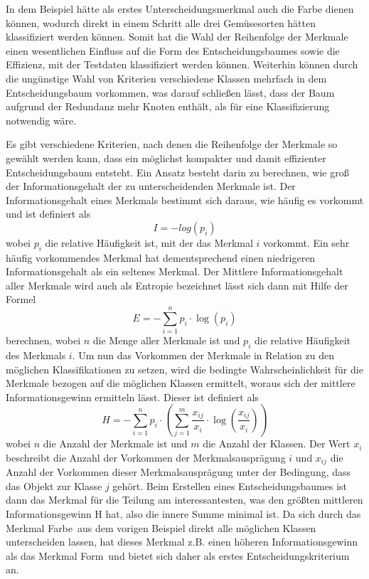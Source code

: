In dem Beispiel hätte als erstes Unterscheidungsmerkmal auch die Farbe dienen können, wodurch direkt in einem Schritt alle drei Gemüsesorten hätten klassifiziert werden können. Somit hat die Wahl der Reihenfolge der Merkmale einen wesentlichen Einfluss auf die Form des Entscheidungsbaumes sowie die Effizienz, mit der Testdaten klassifiziert werden können. Weiterhin können durch die ungünstige Wahl von Kriterien verschiedene Klassen mehrfach in dem Entscheidungsbaum vorkommen, was darauf schließen lässt, dass der Baum aufgrund der Redundanz mehr Knoten enthält, als für eine Klassifizierung notwendig wäre.

Es gibt verschiedene Kriterien, nach denen die Reihenfolge der Merkmale so gewählt werden kann, dass ein möglichst kompakter und damit effizienter Entscheidungsbaum entsteht. Ein Ansatz besteht darin zu berechnen, wie groß der Informationsgehalt der zu unterscheidenden Merkmale ist. Der Informationsgehalt eines Merkmals bestimmt sich daraus, wie häufig es vorkommt und ist definiert als 
\[I = -log(p_i)\] wobei $p_i$ die relative Häufigkeit ist, mit der das Merkmal $i$ vorkommt. Ein sehr häufig vorkommendes Merkmal hat dementsprechend einen niedrigeren Informationsgehalt als ein seltenes Merkmal. Der Mittlere Informationsgehalt aller Merkmale wird auch als Entropie bezeichnet lässt sich dann mit Hilfe der Formel 
\[E = - \sum \limits_{i=1}^n p_i \cdot \log (p_i)\] berechnen, wobei $n$ die Menge aller Merkmale ist und $p_i$ die relative Häufigkeit des Merkmals $i$.
Um nun das Vorkommen der Merkmale in Relation zu den möglichen Klassifikationen zu setzen, wird die bedingte Wahrscheinlichkeit für die Merkmale bezogen auf die möglichen Klassen ermittelt, woraus sich der mittlere Informationsgewinn ermitteln lässt. Dieser ist definiert als 
\[H = - \sum \limits_{i=1}^n p_i \cdot (\sum \limits_{j=1}^m \frac{x_{ij}}{x_i} \cdot \log (\frac{x_{ij}}{x_i}))\] wobei $n$ die Anzahl der Merkmale ist und $m$ die Anzahl der Klassen. Der Wert $x_i$ beschreibt die Anzahl der Vorkommen der Merkmalsausprägung $i$ und $x_{ij}$ die Anzahl der Vorkommen dieser Merkmalsausprägung unter der Bedingung, dass das Objekt zur Klasse $j$ gehört.
Beim Erstellen eines Entscheidungsbaumes ist dann das Merkmal für die Teilung am interessantesten, was den größten mittleren Informationsgewinn H hat, also die innere Summe minimal ist.
Da sich durch das Merkmal \glqq Farbe\grqq\ aus dem vorigen Beispiel direkt alle möglichen Klassen unterscheiden lassen, hat dieses Merkmal z.B. einen höheren Informationsgewinn als das Merkmal \glqq Form\grqq\ und bietet sich daher als erstes Entscheidungskriterium an.

